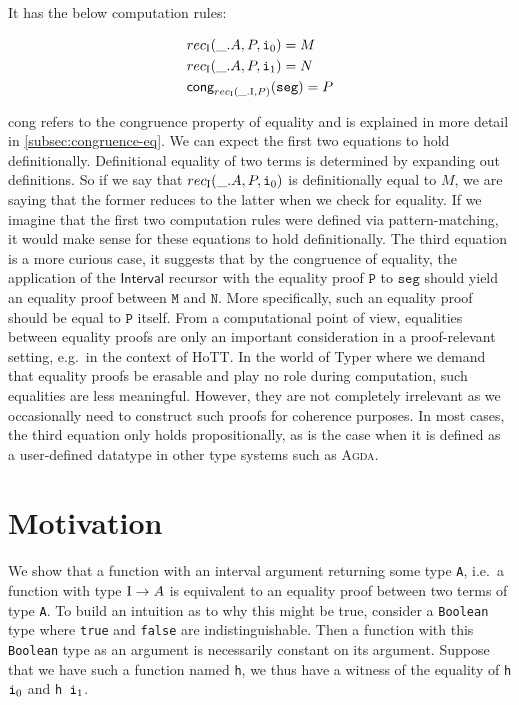\documentclass[12pt,twoside,maitrise]{dms}
\theoremstyle{definition}
\numberwithin{equation}{section}
\numberwithin{table}{chapter}
\numberwithin{figure}{chapter}
\newcommand\kw[1] {\textsf{#1}}
\newcommand\id[1] {\texttt{#1}}
\newcommand\fn[1] {\texttt{#1}}
\def\Agda{\textsc{Agda}\xspace}
\begin{document}
It has the below computation rules:

\begin{align*}
  & rec_{\bI}(\_ . A, P, \ileft) = M \\
  & rec_{\bI}(\_ . A, P, \iright) = N \\
  & \kw{cong}_{rec_{\bI}(\_ . \bI, P)}(\id{seg}) = P
\end{align*}

\kw{cong} refers to the congruence property of equality and is explained in more
detail in \autoref{subsec:congruence-eq}. We can expect the first two equations
to hold definitionally. Definitional equality of two terms is determined by
expanding out definitions. So if we say that $rec_{\bI}(\_ . A, P, \ileft)$ is
definitionally equal to $M$, we are saying that the former reduces to the latter
when we check for equality. If we imagine that the first two computation rules
were defined via pattern-matching, it would make sense for these equations to
hold definitionally. The third equation is a more curious case, it suggests that
by the congruence of equality, the application of the $\kw{Interval}$ recursor
with the equality proof $\id{P}$ to $\id{seg}$ should yield an equality proof
between $\id{M}$ and $\id{N}$. More specifically, such an equality proof should
be equal to $\id{P}$ itself. From a computational point of view, equalities
between equality proofs are only an important consideration in a proof-relevant
setting, e.g.\ in the context of HoTT. In the world of Typer where we demand
that equality proofs be erasable and play no role during computation, such
equalities are less meaningful. However, they are not completely irrelevant as
we occasionally need to construct such proofs for coherence purposes. In most
cases, the third equation only holds propositionally, as is the case when it is
defined as a user-defined datatype in other type systems such as \Agda{}.

\section{Motivation}
We show that a function with an interval argument returning some type \id{A},
i.e.\ a function with type \fn{$\mathrm{I} \rightarrow A$} is equivalent to an equality
proof between two terms of type \id{A}. To build an intuition as to why this
might be true, consider a \id{Boolean} type where \id{true} and \id{false} are
indistinguishable. Then a function with this \id{Boolean} type as an argument is
necessarily constant on its argument. Suppose that we have such a function named
\id{h}, we thus have a witness of the equality of \fn{h $\ileft$} and \fn{h
  $\iright$}.
\end{document}

